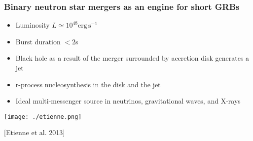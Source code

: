 \begin{frame}
\frametitle{Binary neutron star mergers as an engine for short GRBs}
\hspace{-0.5cm}
\begin{minipage}[]{0.5\textwidth}
\begin{itemize}
\item Luminosity $L \simeq 10^{48} \mathrm{erg\, s^{-1}}$
\item Burst duration $< 2$s
\item Black hole as a result of the merger surrounded by accretion disk generates a jet
\item r-process nucleosynthesis in the disk and the jet
\item Ideal multi-messenger source in neutrinos, gravitational waves, and X-rays
\end{itemize}
\end{minipage}
\hspace{0.5cm}
\begin{minipage}[]{0.4\textwidth}
\begin{minipage}[]{\textwidth}
\texttt{[image: ./etienne.png]}
\end{minipage}

\begin{minipage}[]{\textwidth}
\small [Etienne et al. 2013]
\end{minipage}
\end{minipage}

\end{frame}



